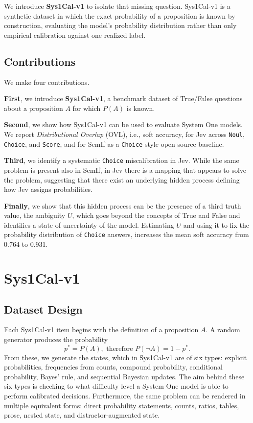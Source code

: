 \documentclass[twoside]{article}
\begin{document}
We introduce \textbf{Sys1Cal-v1} to isolate that missing question. Sys1Cal-v1 is a synthetic dataset in which the exact probability of a proposition is known by construction, evaluating the model's probability distribution rather than only empirical calibration against one realized label.

\subsection{Contributions}

We make four contributions.

\textbf{First}, we introduce \textbf{Sys1Cal-v1}, a benchmark dataset of True/False questions about a proposition $A$ for which $P(A)$ is known.

\textbf{Second}, we show how Sys1Cal-v1 can be used to evaluate System One models. We report \textit{Distributional Overlap} (OVL), i.e., soft accuracy, for Jev across \texttt{Noul}, \texttt{Choice}, and \texttt{Score}, and for SemIf \cite{semif_repo} as a \texttt{Choice}-style open-source baseline.

\textbf{Third}, we identify a systematic \texttt{Choice} miscalibration in Jev. While the same problem is present also in SemIf, in Jev there is a mapping that appears to solve the problem, suggesting that there exist an underlying hidden process defining how Jev assigns probabilities.

\textbf{Finally}, we show that this hidden process can be the presence of a third truth value, the ambiguity $U$, which goes beyond the concepts of True and False and identifies a state of uncertainty of the model. Estimating $U$ and using it to fix the probability distribution of \texttt{Choice} answers, increases the mean soft accuracy from 0.764 to 0.931.



\section{Sys1Cal-v1}

\subsection{Dataset Design}

Each Sys1Cal-v1 item begins with the definition of a proposition $A$. A random generator produces the probability
\[
  p^* = P(A), \text{ therefore } P(\neg A)=1-p^*.
\]
From these, we generate the states, which in Sys1Cal-v1 are of six types: explicit probabilities, frequencies from counts, compound probability, conditional probability, Bayes' rule, and sequential Bayesian updates. 
The aim behind these six types is checking to what difficulty level a System One model is able to perform calibrated decisions.
Furthermore, the same problem can be rendered in multiple equivalent forms: direct probability statements, counts, ratios, tables, prose, nested state, and distractor-augmented state. 
\end{document}
